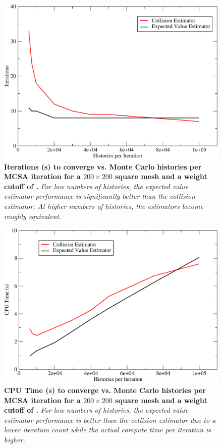 \begin{figure}[t!]
  \centering
  \includegraphics[width=6in,clip]{chapters/mc_background/estimator_nh_iters.pdf}
  \caption{\textbf{Iterations (s) to converge vs. Monte Carlo
      histories per MCSA iteration for a $200 \times 200$ square mesh
      and a weight cutoff of .} \textit{For low numbers of
      histories, the expected value estimator performance is
      significantly better than the collision estimator. At higher
      numbers of histories, the estimators become roughly
      equivalent.}}
  \label{fig:estimator_nh_iters}
\end{figure}

\begin{figure}[t!]
  \centering
  \includegraphics[width=6in,clip]{chapters/mc_background/estimator_nh_time.pdf}
  \caption{\textbf{CPU Time (s) to converge vs. Monte Carlo histories
      per MCSA iteration for a $200 \times 200$ square mesh and a
      weight cutoff of .} \textit{For low numbers of
      histories, the expected value estimator performance is better
      than the collision estimator due to a lower iteration count
      while the actual compute time per iteration is higher.}}
  \label{fig:estimator_nh_time}
\end{figure}


